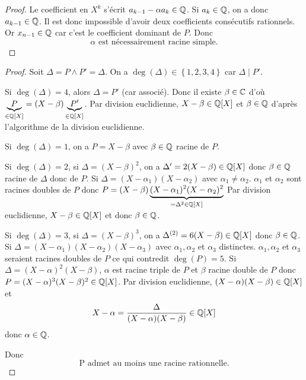 \begin{proof}
	Le coefficient en $X^{k}$ s'écrit $a_{k-1}-\alpha a_{k}\in\mathbb{Q}$. Si $a_{k}\in\mathbb{Q}$, on a donc $a_{k-1}\in\mathbb{Q}$. Il est donc impossible d'avoir deux coefficients consécutifs rationnels. Or $x_{n-1}\in\mathbb{Q}$ car c'est le coefficient dominant de $P$. Donc 
	\begin{equation}
		\boxed{\alpha\text{ est nécessairement racine simple.}}
	\end{equation}
\end{proof}

\begin{proof}
	Soit $\Delta=P\wedge P'=\Delta$. On a $\deg(\Delta)\in\left\{1,2,3,4\right\}$ car $\Delta\mid P'$.

	Si $\deg(\Delta)=4$, alors $\Delta=P'$ (car associé). Donc il existe $\beta\in\mathbb{C}$ d'où $\underbrace{P}_{\in\mathbb{Q}[X]}=(X-\beta)\underbrace{P'}_{\in\mathbb{Q}[X]}$. Par division euclidienne, $X-\beta\in\mathbb{Q}[X]$ et $\beta\in\mathbb{Q}$ d'après l'algorithme de la division euclidienne.

	Si $\deg(\Delta)=1$, on a $P=X-\beta$ avec $\beta\in\mathbb{Q}$ racine de $P$.

	Si $\deg(\Delta)=2$, si $\Delta=(X-\beta)^{2}$, on a $\Delta'=2(X-\beta)\in\mathbb{Q}[X]$ donc $\beta\in\mathbb{Q}$ racine de $\Delta$ donc de $P$.
	Si $\Delta=(X-\alpha_{1})(X-\alpha_{2})$ avec $\alpha_{1}\neq\alpha_{2}$. $\alpha_{1}$ et $\alpha_{2}$ sont racines doubles de $P$ donc $P=(X-\beta)\underbrace{(X-\alpha_{1})^{2}(X-\alpha_{2})^{2}}_{=\Delta^{2}\in\mathbb{Q}[X]}$
	Par division euclidienne, $X-\beta\in\mathbb{Q}[X]$ et donc $\beta\in\mathbb{Q}$.

	Si $\deg(\Delta)=3$, si $\Delta=(X-\beta)^{3}$, on a $\Delta^{(2)}=6(X-\beta)\in\mathbb{Q}[X]$ donc $\beta\in\mathbb{Q}$.
	Si $\Delta=(X-\alpha_{1})(X-\alpha_{2})(X-\alpha_{3})$ avec $\alpha_{1},\alpha_{2}$ et $\alpha_{3}$ distinctes. $\alpha_{1},\alpha_{2}$ et $\alpha_{3}$ seraient racines doubles de $P$ ce qui contredit $\deg(P)=5$.
	Si $\Delta=(X-\alpha)^{2}(X-\beta)$, $\alpha$ est racine triple de $P$ et $\beta$ racine double de $P$ donc $P=(X-\alpha)^{3}(X-\beta)^{2}\in\mathbb{Q}[X]$. Par division euclidienne, $(X-\alpha)(X-\beta)\in\mathbb{Q}[X]$ et 
	\begin{equation}
		X-\alpha=\frac{\Delta}{(X-\alpha)(X-\beta)}\in\mathbb{Q}[X]
	\end{equation}
	donc $\alpha\in\mathbb{Q}$.

	Donc
	\begin{equation}
		\boxed{\text{P admet au moins une racine rationnelle.}}
	\end{equation}
\end{proof}

